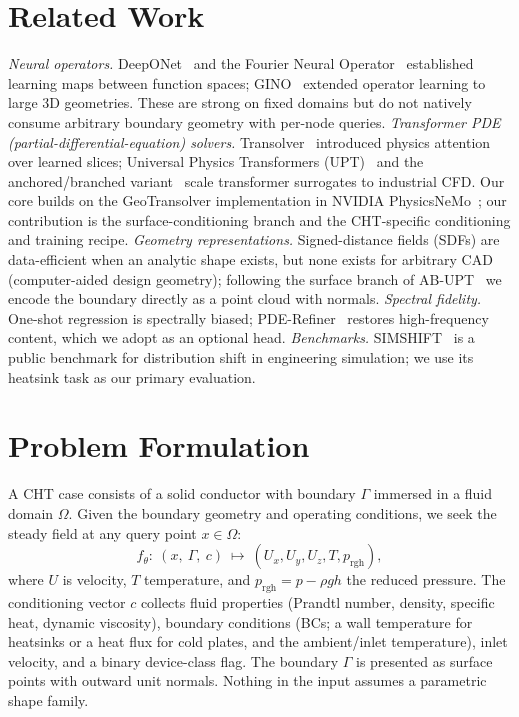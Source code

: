 \documentclass[conference]{IEEEtran}
\begin{document}
\section{Related Work}
\textit{Neural operators.} DeepONet~\cite{deeponet} and the Fourier Neural Operator~\cite{fno}
established learning maps between function spaces; GINO~\cite{gino} extended operator learning to
large 3D geometries. These are strong on fixed domains but do not natively consume arbitrary boundary
geometry with per-node queries. \textit{Transformer PDE (partial-differential-equation) solvers.} Transolver~\cite{transolver}
introduced physics attention over learned slices; Universal Physics Transformers (UPT)~\cite{upt} and the anchored/branched
variant~\cite{abupt} scale transformer surrogates to industrial CFD. Our core builds on the
GeoTransolver implementation in NVIDIA PhysicsNeMo~\cite{physicsnemo}; our contribution is the
surface-conditioning branch and the CHT-specific conditioning and training recipe.
\textit{Geometry representations.} Signed-distance fields (SDFs) are data-efficient when an analytic shape
exists, but none exists for arbitrary CAD (computer-aided design geometry); following the surface branch of AB-UPT~\cite{abupt} we
encode the boundary directly as a point cloud with normals. \textit{Spectral fidelity.} One-shot
regression is spectrally biased; PDE-Refiner~\cite{pderefiner} restores high-frequency content, which
we adopt as an optional head. \textit{Benchmarks.} SIMSHIFT~\cite{simshift} is a public benchmark for
distribution shift in engineering simulation; we use its heatsink task as our primary evaluation.

\section{Problem Formulation}
A CHT case consists of a solid conductor with boundary $\Gamma$ immersed in a fluid domain $\Omega$.
Given the boundary geometry and operating conditions, we seek the steady field at any query point
$x\in\Omega$:
\begin{equation}
f_\theta:\ (x,\ \Gamma,\ c)\ \mapsto\ (U_x,U_y,U_z,T,p_{\mathrm{rgh}}),
\end{equation}
where $U$ is velocity, $T$ temperature, and $p_{\mathrm{rgh}}=p-\rho g h$ the reduced pressure. The
conditioning vector $c$ collects fluid properties (Prandtl number, density, specific heat, dynamic
viscosity), boundary conditions (BCs; a wall temperature for heatsinks or a heat flux for cold plates, and
the ambient/inlet temperature), inlet velocity, and a binary device-class flag. The boundary $\Gamma$
is presented as surface points with outward unit normals. Nothing in the input assumes a parametric
shape family.
\end{document}
